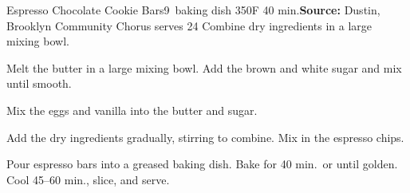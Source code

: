 \begin{recipe}{Espresso Chocolate Cookie Bars}{9\inch{}\inch\ baking dish \hfill 350\0F \hfill 40 min.}{\textbf{Source:} Dustin, Brooklyn Community Chorus \hfill serves 24}
 Combine dry ingredients in a large mixing bowl.

 Melt the butter in a large mixing bowl. Add the brown and white sugar and mix until smooth.

 Mix the eggs and vanilla into the butter and sugar.

 Add the dry ingredients gradually, stirring to combine. Mix in the espresso chips.

 \newstep Pour espresso bars into a greased baking dish. Bake for 40 min.\ or until golden. Cool 45--60 min., slice, and serve.
\end{recipe}
